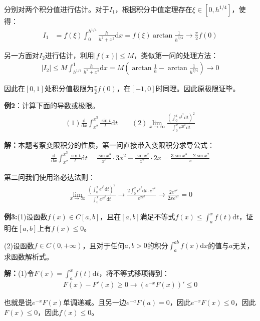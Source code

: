 \documentclass{ctexart}
\let\oldtextbf\textbf %
\renewcommand{\textbf}[1]{\textcolor{btex}{\oldtextbf{#1}}} %
\begin{document}
分别对两个积分值进行估计。对于$I_1$，根据积分中值定理存在$\xi\in[0,h^{1/4}]$，使得：
\begin{align*}
    I_1&=f(\xi)\int_0^{h^{1/4}}\frac{h}{h^2+x^2}\mathrm{d}x=f(\xi)\arctan\frac{1}{h^{3/4}}\to\frac{\pi}{2}f(0)
\end{align*}

另一方面对$I_2$进行估计，利用$|f(x)|\leq M$，类似第一问的处理方法：
\begin{align*}
    |I_2|\leq M\int_{h^{1/4}}^1\frac{h}{h^2+x^2}\mathrm{d}x=M(\arctan\frac{1}{h}-\arctan\frac{1}{h^{3/4}})\to 0
\end{align*}

因此在$[0,1]$处积分值极限为$\frac{\pi}{2}f(0)$，在$[-1,0]$时同理。因此原极限证毕。

\textbf{例2}：计算下面的导数或极限。
\begin{align*}
    (1)\frac{\mathrm{d}}{\mathrm{d}x}\int_{x^2}^{x^3}\frac{\sin t}{t}\mathrm{d}t\qquad (2)\lim_{x\to\infty}\frac{(\int_0^x e^{t^2}\mathrm{d}t)^2}{\int_0^x e^{2t^2}\mathrm{d}t}
\end{align*}

\textbf{解：}本题考察变限积分的性质，第一问直接带入变限积分求导公式：
\begin{align*}
    \frac{\mathrm{d}}{\mathrm{d}x}\int_{x^2}^{x^3}\frac{\sin t}{t}\mathrm{d}t=\frac{\sin x^3}{x^3}\cdot 3x^2-\frac{\sin x^2}{x^2}\cdot 2x=\frac{3\sin x^3-2\sin x^2}{x}
\end{align*}

第二问我们使用洛必达法则：
\begin{align*}
    \lim_{x\to\infty}\frac{(\int_0^x e^{t^2}\mathrm{d}t)^2}{\int_0^x e^{2t^2}\mathrm{d}t}\to \frac{2\int_0^x e^{t^2}\mathrm{d}t\cdot e^{x^2}}{e^{2x^2}}\to\frac{2e^{x^2}}{2xe^{x^2}}=0
\end{align*}

\textbf{例3:}(1)设函数$f(x)\in C[a,b]$，且在$[a,b]$满足不等式$f(x)\leq\int_a^x f(t)\mathrm{d}t$，证明在$[a,b]$上有$f(x)\leq 0$。

(2)设函数$f\in C(0,+\infty)$，且对于任何$a,b>0$的积分$\int_a^{ab}f(x)\mathrm{d}x$的值与$a$无关，求函数解析式。

\textbf{解：}(1)令$F(x)=\int_a^x f(t)\mathrm{d}t$，将不等式移项得到：
\begin{align*}
    F(x)-F'(x)\geq 0\to (e^{-x}F(x))'\leq 0
\end{align*}

也就是说$e^{-x}F(x)$单调递减。且另一边$e^{-a}F(a)=0$，因此$e^{-x}F(x)\leq 0$，因此$F(x)\leq 0$，因此$f(x)\leq 0$。
\end{document}
